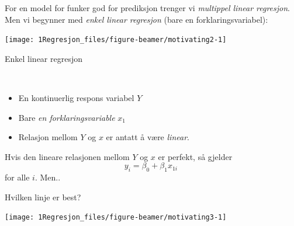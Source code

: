 \documentclass[10pt,ignorenonframetext,]{beamer}
\begin{document}
\begin{frame}

For en model for funker god for prediksjon trenger vi \emph{multippel
linear regresjon}. Men vi begynner med \emph{enkel linear regresjon}
(bare en forklaringsvariabel):

\begin{center}\texttt{[image: 1Regresjon\_files/figure-beamer/motivating2-1]} \end{center}

\end{frame}

\begin{frame}{Enkel linear regresjon}
\protect\hypertarget{enkel-linear-regresjon}{}

\(~\)

\begin{itemize}
\item
  En kontinuerlig respons variabel \(Y\)
\item
  Bare \emph{en forklaringsvariable} \(x_1\)
\item
  Relasjon mellom \(Y\) og \(x\) er antatt å være \emph{linear}.
\end{itemize}

\vspace{6mm}

Hvis den lineare relasjonen mellom \(Y\) og \(x\) er perfekt, så gjelder
\[y_i = \beta_0 + \beta_1 x_{1i}\ \] for alle \(i\). Men..

\end{frame}

\begin{frame}

Hvilken linje er best?

\begin{center}\texttt{[image: 1Regresjon\_files/figure-beamer/motivating3-1]} \end{center}

\end{frame}
\end{document}
